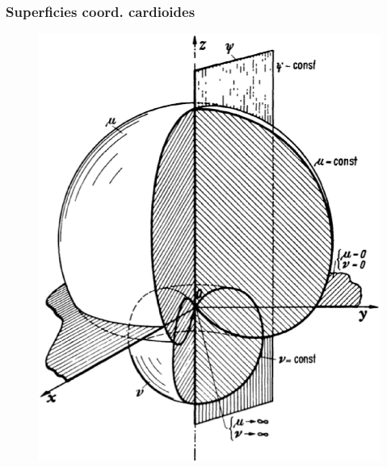 \documentclass[12pt]{beamer}
\begin{document}
\begin{frame}
\frametitle{Superficies coord. cardioides}
\begin{figure}[H]
\centering
\includegraphics[scale=0.27]{Imagenes/Sistema_Cardioide.eps}
\end{figure}
\end{frame}
\end{document}
